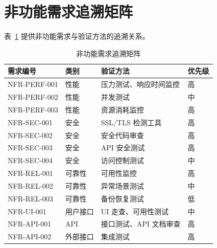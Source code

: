 \section{非功能需求追溯矩阵}

表~\ref{tab:nfr-traceability} 提供非功能需求与验证方法的追溯关系。

\begin{table}[htbp]
    \centering
    \caption{非功能需求追溯矩阵}
    \label{tab:nfr-traceability}
    \begin{tabularx}{\textwidth}{@{}l l X l@{}}
        \toprule
        \textbf{需求编号} & \textbf{类别} & \textbf{验证方法} & \textbf{优先级} \\
        \midrule
        NFR-PERF-001  & 性能          & 压力测试、响应时间监控   & 高            \\
        NFR-PERF-002  & 性能          & 并发测试          & 中            \\
        NFR-PERF-003  & 性能          & 资源消耗监控        & 高            \\
        NFR-SEC-001   & 安全          & SSL/TLS 检测工具  & 高            \\
        NFR-SEC-002   & 安全          & 安全代码审查        & 高            \\
        NFR-SEC-003   & 安全          & API 安全测试      & 高            \\
        NFR-SEC-004   & 安全          & 访问控制测试        & 中            \\
        NFR-REL-001   & 可靠性         & 可用性监控         & 高            \\
        NFR-REL-002   & 可靠性         & 异常场景测试        & 中            \\
        NFR-REL-003   & 可靠性         & 备份恢复测试        & 低            \\
        NFR-UI-001    & 用户接口        & UI 走查、可用性测试   & 中            \\
        NFR-API-001   & API         & 接口测试、API 文档审查 & 高            \\
        NFR-API-002   & 外部接口        & 集成测试          & 高            \\
        \bottomrule
    \end{tabularx}
\end{table}
